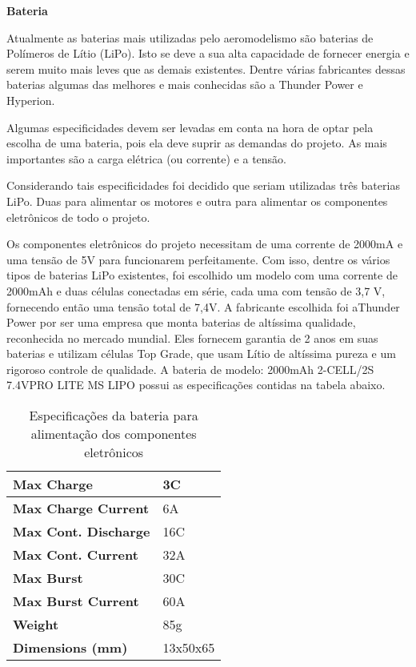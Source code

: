 \textbf{Bateria}

Atualmente as baterias mais utilizadas pelo aeromodelismo são baterias de Polímeros de Lítio (LiPo).  Isto se deve a sua alta capacidade de fornecer energia e serem muito mais leves que as demais existentes. Dentre várias fabricantes dessas baterias algumas das melhores e mais conhecidas são a Thunder Power e Hyperion. \cite{aeromodelismo2011}

Algumas especificidades devem ser levadas em conta na hora de optar pela escolha de uma bateria, pois ela deve suprir as demandas do projeto. As mais importantes são a carga elétrica (ou corrente) e a tensão. \cite{aeromodelismo2011} \cite{propulsao2011}

Considerando tais especificidades foi decidido que seriam utilizadas três  baterias LiPo. Duas para alimentar os motores e outra para alimentar os componentes eletrônicos de todo o projeto.

Os componentes eletrônicos do projeto necessitam de uma corrente de 2000mA e uma tensão de 5V para funcionarem perfeitamente. Com isso, dentre os vários tipos de baterias LiPo existentes, foi escolhido um modelo com uma corrente de 2000mAh e duas células conectadas em série, cada uma com tensão de 3,7 V, fornecendo então uma tensão total de 7,4V. A fabricante escolhida foi aThunder Power por ser uma empresa que monta baterias de altíssima qualidade, reconhecida no mercado mundial. Eles fornecem garantia de 2 anos em suas baterias e utilizam células Top Grade, que usam Lítio de altíssima pureza e um rigoroso controle de qualidade. A bateria de modelo: 2000mAh 2-CELL/2S 7.4VPRO LITE MS LIPO possui as especificações contidas na tabela abaixo. \cite{thunderpower2014}

\begin{table}[H]
\centering
\begin{tabular}{|l|l|}
\hline
\textbf{Max Charge} & 3C \\ \hline
\textbf{Max Charge Current} & 6A \\ \hline
\textbf{Max Cont. Discharge} & 16C \\ \hline
\textbf{Max Cont. Current} & 32A \\ \hline
\textbf{Max Burst} & 30C \\ \hline
\textbf{Max Burst Current} & 60A \\ \hline
\textbf{Weight} & 85g \\ \hline
\textbf{Dimensions (mm)} & 13x50x65 \\ \hline
\end{tabular}
\caption{Especificações da bateria para alimentação dos componentes eletrônicos \cite{thunderpower2014}}
\end{table}

